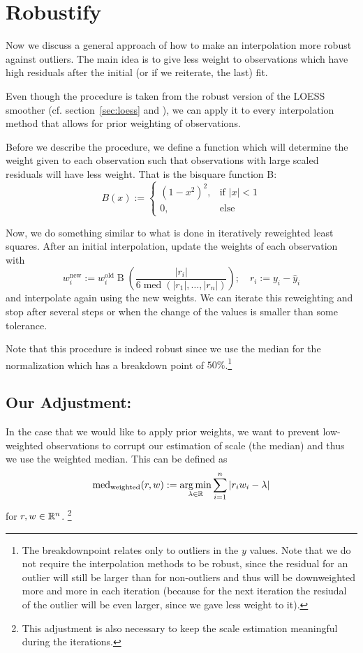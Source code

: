 \section{Robustify}{
	\label{sec:loess_robustify}
	{ %
		Now we discuss a general approach of how to make an interpolation more robust against outliers. The main idea is to give less weight to observations which have high residuals after the initial (or if we reiterate, the last) fit.

		Even though the procedure is taken from the robust version of the LOESS smoother (cf. section~\ref{sec:loess} and \cite{clevelandRobustLocallyWeighted1979}), we can apply it to every interpolation method that allows for prior weighting of observations.
	}
	
	{	
		Before we describe the procedure, we define a function which will determine the weight given to each observation such that observations with large scaled residuals will have less weight. That is the bisquare function B:
		$$
			B(x):=\begin{cases}
				\left(1-x^{2}\right)^{2}, & \text{if } |x|<1 \\
				0,                        & \text{else }
			\end{cases}
		$$

		Now, we do something similar to what is done in iteratively reweighted least squares. After an initial interpolation, update the weights of each observation with
		\begin{equation}
			w_i^\text{new}:=w_i^\text{old} \operatorname{B}\left(\frac{|r_i|}{6\operatorname{med}\left(|r_1|,\dots,|r_n|\right)}\right);\quad
			r_i := y_i - \hat y_i
			\label{eq:bisquare}
		\end{equation}
		and interpolate again using the new weights. We can iterate this reweighting and stop after several steps or when the change of the values is smaller than some tolerance.
	}

	Note that this procedure is indeed robust since we use the median for the normalization which has a breakdown point of $50 \%$.\footnote{The breakdownpoint relates only to outliers in the $y$ values. Note that we do not require the interpolation methods to be robust, since the residual for an outlier will  still be larger than for non-outliers and thus will be downweighted more and more in each iteration (because for the next iteration the resiudal of the outlier will be even larger, since we gave less weight to it).}
	\subsection{Our Adjustment:}{ 
		In the case that we would like to apply prior weights, we want to prevent low-weighted observations to corrupt our estimation of scale (the median) and thus we use the weighted median. This can be defined as
		$$
			\operatorname{med}_\text{weighted}(r,w) := \operatorname*{arg\, min}_{\lambda \in \mathbb{R}} \sum_{i=1}^n |r_iw_i -\lambda|
		$$
		for $r,w\in \mathbb{R}^n$. \footnote{This adjustment is also necessary to keep the scale estimation meaningful during the iterations.}
	}
}
